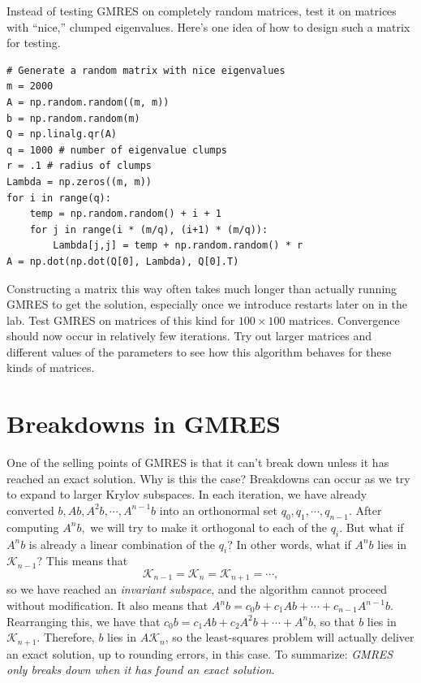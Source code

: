 \begin{problem}
Instead of testing GMRES on completely random matrices, test it on matrices with ``nice,'' clumped eigenvalues.
Here's one idea of how to design such a matrix for testing.
\begin{lstlisting}
# Generate a random matrix with nice eigenvalues
m = 2000
A = np.random.random((m, m))
b = np.random.random(m)
Q = np.linalg.qr(A)
q = 1000 # number of eigenvalue clumps
r = .1 # radius of clumps
Lambda = np.zeros((m, m))
for i in range(q):
    temp = np.random.random() + i + 1
    for j in range(i * (m/q), (i+1) * (m/q)):
        Lambda[j,j] = temp + np.random.random() * r
A = np.dot(np.dot(Q[0], Lambda), Q[0].T)
\end{lstlisting}
Constructing a matrix this way often takes much longer than actually running GMRES to get the solution, especially once we
introduce restarts later on in the lab.
Test GMRES on matrices of this kind for $100\times 100$ matrices.
Convergence should now occur in relatively few iterations.
Try out larger matrices and different values of the parameters to see how this algorithm behaves for these kinds of matrices.
\label{prob:GMRESClumps}
\end{problem}

\section*{Breakdowns in GMRES}
One of the selling points of GMRES is that it can't break down unless it has reached an exact solution.
Why is this the case?
Breakdowns can occur as we try to expand to larger Krylov subspaces.
In each iteration, we have already converted $b,Ab,A^{2}b,\cdots, A^{n-1}b$ into an orthonormal set $q_0,q_1,\cdots,q_{n-1}$.
After computing $A^nb,$ we will try to make it orthogonal to each of the $q_i$.
But what if $A^{n}b$ is already a linear combination of the $q_i$? In other words, what if $A^{n}b$ lies in $\mathcal{K}_{n-1}$?
This means that
\[
\mathcal{K}_{n-1}=\mathcal{K}_n=\mathcal{K}_{n+1}=\cdots,
\]
so we have reached an \emph{invariant subspace},
and the algorithm cannot proceed without modification.
It also means that $A^{n}b = c_0 b + c_1 A b + \cdots + c_{n-1}A^{n-1}b$.
Rearranging this, we have that $c_0 b = c_1 A b + c_2 A^{2} b + \cdots + A^{n}b$, so that $b$ lies in $\mathcal{K}_{n+1}$.
Therefore, $b$ lies in $A\mathcal{K}_n$, so the least-squares problem will actually deliver an exact solution, up to rounding errors,
in this case.
To summarize: \emph{GMRES only breaks down when it has found an exact solution}.

